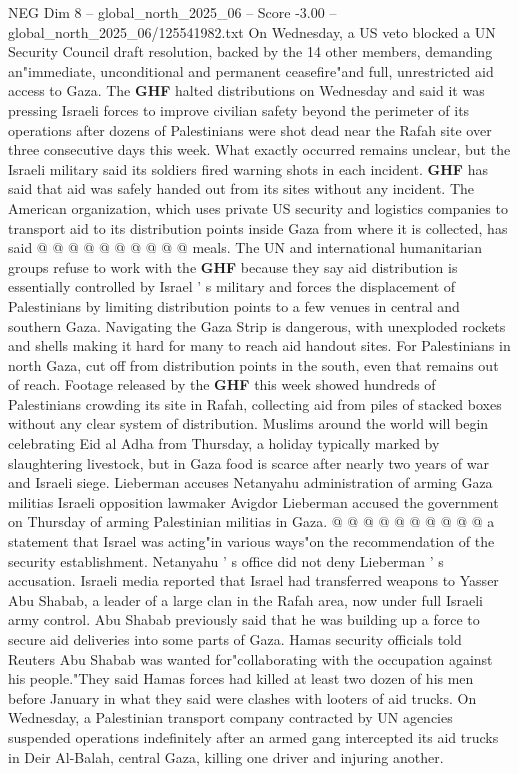 \begin{textsample}{NEG Dim 8 – global\_north\_2025\_06 – Score -3.00 – global\_north\_2025\_06/125541982.txt}
On Wednesday, a US veto blocked a UN Security Council draft resolution, backed by the 14 other members, demanding an"immediate, unconditional and permanent ceasefire"and full, unrestricted aid access to Gaza.
The \textbf{GHF} halted distributions on Wednesday and said it was pressing Israeli forces to improve civilian safety beyond the perimeter of its operations after dozens of Palestinians were shot dead near the Rafah site over three consecutive days this week.
What exactly occurred remains unclear, but the Israeli military said its soldiers fired warning shots in each incident. \textbf{GHF} has said that aid was safely handed out from its sites without any incident.
The American organization, which uses private US security and logistics companies to transport aid to its distribution points inside Gaza from where it is collected, has said @ @ @ @ @ @ @ @ @ @ meals.
The UN and international humanitarian groups refuse to work with the \textbf{GHF} because they say aid distribution is essentially controlled by Israel ' s military and forces the displacement of Palestinians by limiting distribution points to a few venues in central and southern Gaza.
Navigating the Gaza Strip is dangerous, with unexploded rockets and shells making it hard for many to reach aid handout sites.
For Palestinians in north Gaza, cut off from distribution points in the south, even that remains out of reach.
Footage released by the \textbf{GHF} this week showed hundreds of Palestinians crowding its site in Rafah, collecting aid from piles of stacked boxes without any clear system of distribution.
Muslims around the world will begin celebrating Eid al Adha from Thursday, a holiday typically marked by slaughtering livestock, but in Gaza food is scarce after nearly two years of war and Israeli siege.
Lieberman accuses Netanyahu administration of arming Gaza militias Israeli opposition lawmaker Avigdor Lieberman accused the government on Thursday of arming Palestinian militias in Gaza. @ @ @ @ @ @ @ @ @ @ a statement that Israel was acting"in various ways"on the recommendation of the security establishment.
Netanyahu ' s office did not deny Lieberman ' s accusation.
Israeli media reported that Israel had transferred weapons to Yasser Abu Shabab, a leader of a large clan in the Rafah area, now under full Israeli army control.
Abu Shabab previously said that he was building up a force to secure aid deliveries into some parts of Gaza.
Hamas security officials told Reuters Abu Shabab was wanted for"collaborating with the occupation against his people."They said Hamas forces had killed at least two dozen of his men before January in what they said were clashes with looters of aid trucks.
On Wednesday, a Palestinian transport company contracted by UN agencies suspended operations indefinitely after an armed gang intercepted its aid trucks in Deir Al-Balah, central Gaza, killing one driver and injuring another.

\end{textsample}
